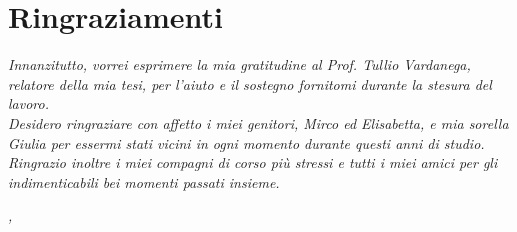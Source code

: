 
\cleardoublepage
{}
{}


\bigskip

\begingroup
\let\clearpage\relax
\let\cleardoublepage\relax
\let\cleardoublepage\relax

\chapter*{Ringraziamenti}

\noindent \textit{Innanzitutto, vorrei esprimere la mia gratitudine al Prof. Tullio Vardanega, relatore della mia tesi, per l'aiuto e il sostegno fornitomi durante la stesura del lavoro.}\\

\noindent \textit{Desidero ringraziare con affetto i miei genitori, Mirco ed Elisabetta, e mia sorella Giulia per essermi stati vicini in ogni momento durante questi anni di studio.}\\

\noindent \textit{Ringrazio inoltre i miei compagni di corso più stressi e tutti i miei amici per gli indimenticabili bei momenti passati insieme.}\\
\bigskip

\noindent\textit{\myLocation, \myTime}
\hfill \myName

\endgroup

